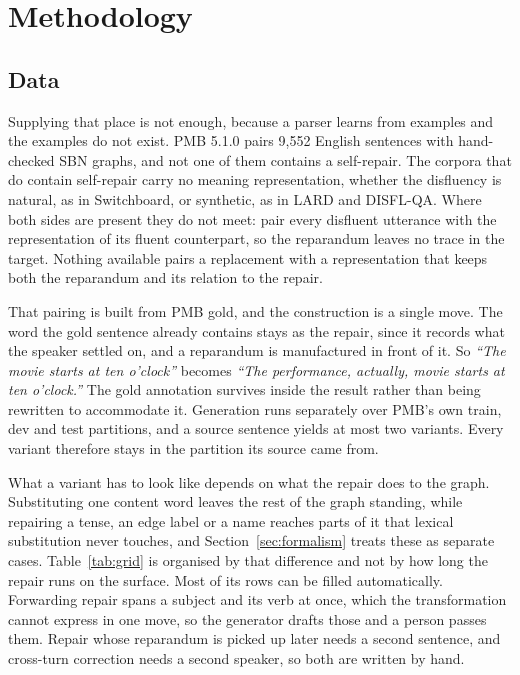 \documentclass{article}
\begin{document}
\section{Methodology}

\subsection{Data}
\label{sec:data}


Supplying that place is not enough, because a parser learns from examples and the
examples do not exist. PMB 5.1.0 pairs 9,552 English sentences with hand-checked
SBN graphs, and not one of them contains a self-repair. The corpora that do
contain self-repair carry no meaning representation, whether the disfluency is
natural, as in Switchboard, or synthetic, as in LARD and DISFL-QA. Where both
sides are present they do not meet: \citet{senSemanticParsingDisfluent2021} pair
every disfluent utterance with the representation of its fluent counterpart, so
the reparandum leaves no trace in the target. Nothing available pairs a
replacement with a representation that keeps both the reparandum and its relation
to the repair.

That pairing is built from PMB gold, and the construction is a single move. The
word the gold sentence already contains stays as the repair, since it records
what the speaker settled on, and a reparandum is manufactured in front of it. So
\textit{``The movie starts at ten o'clock''} becomes \textit{``The performance,
actually, movie starts at ten o'clock.''} The gold annotation survives inside the
result rather than being rewritten to accommodate it. Generation runs separately
over PMB's own train, dev and test partitions, and a source sentence yields at
most two variants. Every variant therefore stays in the partition its source came
from.

What a variant has to look like depends on what the repair does to the graph.
Substituting one content word leaves the rest of the graph standing, while
repairing a tense, an edge label or a name reaches parts of it that lexical
substitution never touches, and Section~\ref{sec:formalism} treats these as
separate cases. Table~\ref{tab:grid} is organised by that difference and not by
how long the repair runs on the surface. Most of its rows can be filled
automatically. Forwarding repair spans a subject and its verb at once, which the
transformation cannot express in one move, so the generator drafts those and a
person passes them. Repair whose reparandum is picked up later needs a second
sentence, and cross-turn correction needs a second speaker, so both are written
by hand.
\end{document}
